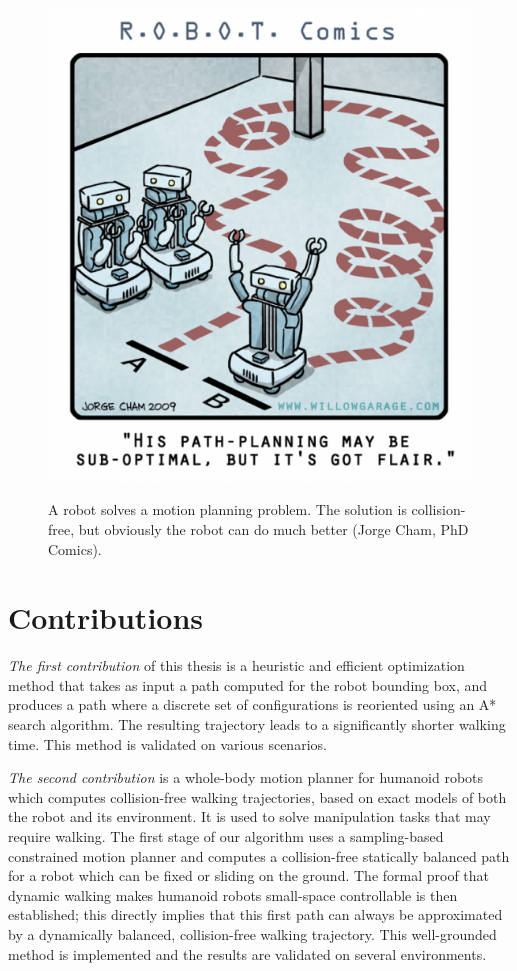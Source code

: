 \begin{figure}[h!]
  \centering
      {\includegraphics[width = 0.6\linewidth]
        {src/chap0-introduction/optimal-motion-planning.png}}
      \caption[A robot solves a motion planning problem.]{A robot
        solves a motion planning problem. The solution is
        collision-free, but obviously the robot can do much better
        (Jorge Cham, PhD Comics).}
      \label{fig:chap0-optimal-motion-planning}
\end{figure}

\section*{Contributions}

\emph{The first contribution} of this thesis is a heuristic and
efficient optimization method that takes as input a path computed for
the robot bounding box, and produces a path where a discrete set of
configurations is reoriented using an A* search algorithm. The
resulting trajectory leads to a significantly shorter walking
time. This method is validated on various scenarios.

\emph{The second contribution} is a whole-body motion planner for
humanoid robots which computes collision-free walking trajectories,
based on exact models of both the robot and its environment. It is
used to solve manipulation tasks that may require walking. The first
stage of our algorithm uses a sampling-based constrained motion
planner and computes a collision-free statically balanced path for a
robot which can be fixed or sliding on the ground. The formal proof
that dynamic walking makes humanoid robots small-space controllable is
then established; this directly implies that this first path can
always be approximated by a dynamically balanced, collision-free
walking trajectory. This well-grounded method is implemented and the
results are validated on several environments.

